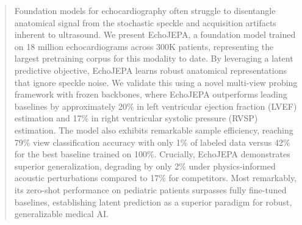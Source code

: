 \documentclass{article}
\theoremstyle{plain}
\theoremstyle{definition}
\theoremstyle{remark}
\begin{document}
\begin{abstract}
Foundation models for echocardiography often struggle to disentangle anatomical signal from the stochastic speckle and acquisition artifacts inherent to ultrasound. We present EchoJEPA, a foundation model trained on 18 million echocardiograms across 300K patients, representing the largest pretraining corpus for this modality to date. By leveraging a latent predictive objective, EchoJEPA learns robust anatomical representations that ignore speckle noise. We validate this using a novel multi-view probing framework with frozen backbones, where EchoJEPA outperforms leading baselines by approximately 20\% in left ventricular ejection fraction (LVEF) estimation and 17\% in right ventricular systolic pressure (RVSP) estimation. The model also exhibits remarkable sample efficiency, reaching 79\% view classification accuracy with only 1\% of labeled data versus 42\% for the best baseline trained on 100\%. Crucially, EchoJEPA demonstrates superior generalization, degrading by only 2\% under physics-informed acoustic perturbations compared to 17\% for competitors. Most remarkably, its zero-shot performance on pediatric patients surpasses fully fine-tuned baselines, establishing latent prediction as a superior paradigm for robust, generalizable medical AI.

\end{abstract}






\end{document}
